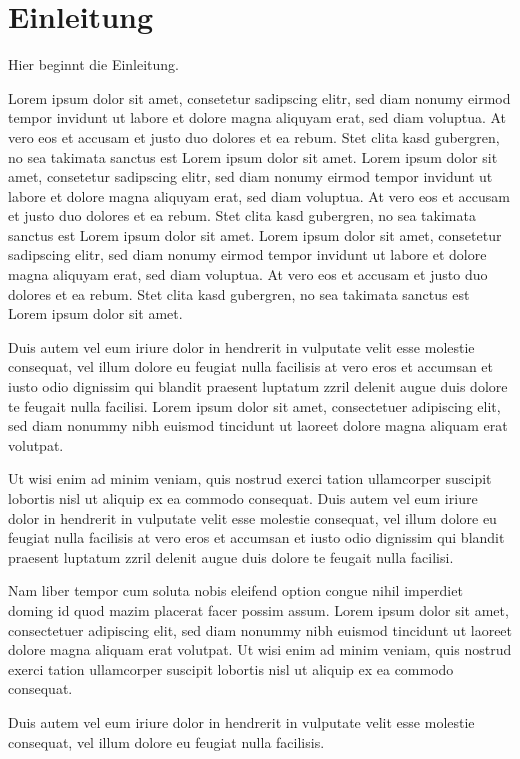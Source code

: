\newpage
\section{Einleitung}
Hier beginnt die Einleitung.

Lorem ipsum dolor sit amet, consetetur sadipscing elitr, sed diam nonumy eirmod tempor invidunt ut labore et dolore magna aliquyam erat, sed diam voluptua. At vero eos et accusam et justo duo dolores et ea rebum. Stet clita kasd gubergren, no sea takimata sanctus est Lorem ipsum dolor sit amet. Lorem ipsum dolor sit amet, consetetur sadipscing elitr, sed diam nonumy eirmod tempor invidunt ut labore et dolore magna aliquyam erat, sed diam voluptua. At vero eos et accusam et justo duo dolores et ea rebum. Stet clita kasd gubergren, no sea takimata sanctus est Lorem ipsum dolor sit amet. Lorem ipsum dolor sit amet, consetetur sadipscing elitr, sed diam nonumy eirmod tempor invidunt ut labore et dolore magna aliquyam erat, sed diam voluptua. At vero eos et accusam et justo duo dolores et ea rebum. Stet clita kasd gubergren, no sea takimata sanctus est Lorem ipsum dolor sit amet.

Duis autem vel eum iriure dolor in hendrerit in vulputate velit esse molestie consequat, vel illum dolore eu feugiat nulla facilisis at vero eros et accumsan et iusto odio dignissim qui blandit praesent luptatum zzril delenit augue duis dolore te feugait nulla facilisi. Lorem ipsum dolor sit amet, consectetuer adipiscing elit, sed diam nonummy nibh euismod tincidunt ut laoreet dolore magna aliquam erat volutpat.

Ut wisi enim ad minim veniam, quis nostrud exerci tation ullamcorper suscipit lobortis nisl ut aliquip ex ea commodo consequat. Duis autem vel eum iriure dolor in hendrerit in vulputate velit esse molestie consequat, vel illum dolore eu feugiat nulla facilisis at vero eros et accumsan et iusto odio dignissim qui blandit praesent luptatum zzril delenit augue duis dolore te feugait nulla facilisi.

Nam liber tempor cum soluta nobis eleifend option congue nihil imperdiet doming id quod mazim placerat facer possim assum. Lorem ipsum dolor sit amet, consectetuer adipiscing elit, sed diam nonummy nibh euismod tincidunt ut laoreet dolore magna aliquam erat volutpat. Ut wisi enim ad minim veniam, quis nostrud exerci tation ullamcorper suscipit lobortis nisl ut aliquip ex ea commodo consequat.

Duis autem vel eum iriure dolor in hendrerit in vulputate velit esse molestie consequat, vel illum dolore eu feugiat nulla facilisis.

